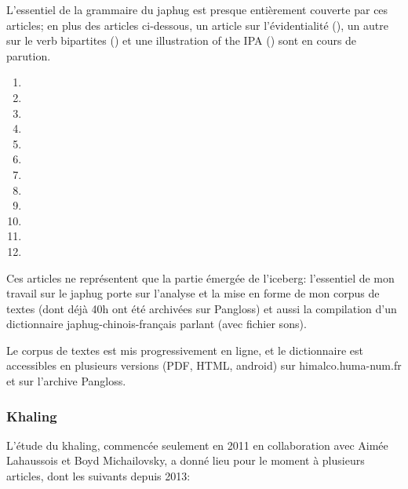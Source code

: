 \documentclass[oldfontcommands,oneside,a4paper,11pt]{article}
\begin{document}
L'essentiel de la grammaire du japhug est presque entièrement couverte par ces articles; en plus des articles ci-dessous, un article sur l'évidentialité (\citealt{jacques19egophoric}), un autre sur le verb bipartites (\citealt{jacques18bipartite}) et une illustration of the IPA (\citealt{jacques18ipa}) sont en cours de parution.

\begin{enumerate}
\item {}
\item {}
\item {}
\item {}
\item {}
\item {}
\item {}
\item {}
\item {}
\item {}
\item  {}
\item {}   
\end{enumerate} 

Ces articles ne représentent que la partie émergée de l'iceberg: l'essentiel de mon travail sur le japhug porte sur l'analyse et la mise en forme de mon corpus de textes (dont déjà 40h ont été archivées sur Pangloss) et aussi la compilation d'un dictionnaire japhug-chinois-français parlant (avec fichier sons). 

Le corpus de textes est mis progressivement en ligne, et le dictionnaire est accessibles en plusieurs versions (PDF, HTML, android) sur himalco.huma-num.fr et sur l'archive Pangloss.


\subsubsection{Khaling} \label{sec:khaling}
L'étude du khaling, commencée seulement en 2011 en collaboration avec Aimée Lahaussois et Boyd Michailovsky, a donné lieu pour le moment à plusieurs articles, dont les suivants depuis 2013:
 
\end{document}
